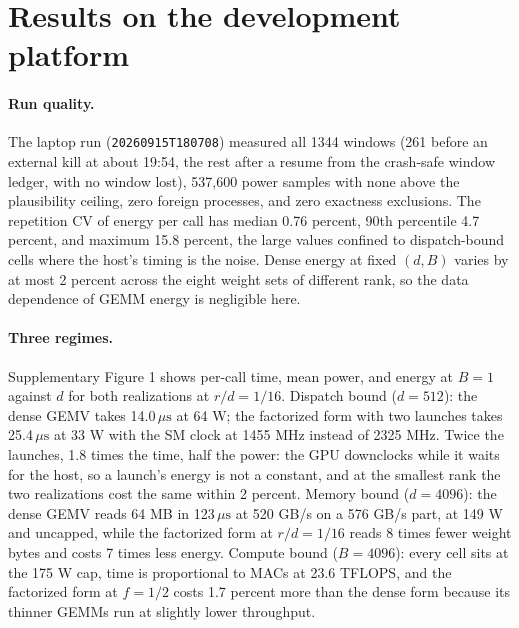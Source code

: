 \documentclass{article}
\newcommand{\us}{\,\mu\mathrm{s}}
\begin{document}
\section{Results on the development platform}
\label{sec:results}

\paragraph{Run quality.} The laptop run (\texttt{20260915T180708}) measured all 1344 windows (261 before an external kill at about 19:54, the rest after a resume from the crash-safe window ledger, with no window lost), 537,600 power samples with none above the plausibility ceiling, zero foreign processes, and zero exactness exclusions. The repetition CV of energy per call has median 0.76 percent, 90th percentile 4.7 percent, and maximum 15.8 percent, the large values confined to dispatch-bound cells where the host's timing is the noise. Dense energy at fixed $(d, B)$ varies by at most 2 percent across the eight weight sets of different rank, so the data dependence of GEMM energy is negligible here.

\paragraph{Three regimes.} Supplementary Figure 1 shows per-call time, mean power, and energy at $B = 1$ against $d$ for both realizations at $r/d = 1/16$. Dispatch bound ($d = 512$): the dense GEMV takes 14.0$\us$ at 64 W; the factorized form with two launches takes 25.4$\us$ at 33 W with the SM clock at 1455 MHz instead of 2325 MHz. Twice the launches, 1.8 times the time, half the power: the GPU downclocks while it waits for the host, so a launch's energy is not a constant, and at the smallest rank the two realizations cost the same within 2 percent. Memory bound ($d = 4096$): the dense GEMV reads 64 MB in 123$\us$ at 520 GB/s on a 576 GB/s part, at 149 W and uncapped, while the factorized form at $r/d = 1/16$ reads 8 times fewer weight bytes and costs 7 times less energy. Compute bound ($B = 4096$): every cell sits at the 175 W cap, time is proportional to MACs at 23.6 TFLOPS, and the factorized form at $f = 1/2$ costs 1.7 percent more than the dense form because its thinner GEMMs run at slightly lower throughput.
\end{document}

